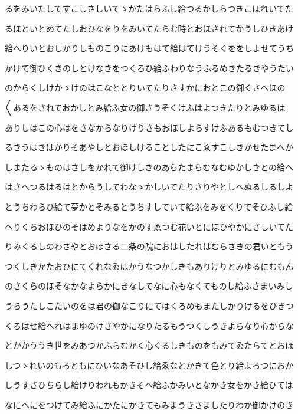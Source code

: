 \documentclass[a4paper,11pt,landscape]{ltjtarticle}
\begin{document}
\par\medskip
るをみいたしてすこしさしいてゝかたはらふし給つるかしらつきこほれいてた
\par\medskip
るほといとめてたしおひなをりをみいてたらむ時とおほされてかうしひきあけ
\par\medskip
給へりいとおしかりしものこりにあけもはて給はてけうそくををしよせてうち
\par\medskip
かけて御ひくきのしとけなきをつくろひ給ふわりなうふるめきたるきやうたい
\par\medskip
のからくしけかゝけのはこなととりいてたりさすかにおとこの御くさへほの
\par\medskip
〱あるをされておかしとみ給ふ女の御さうそくけふはよつきたりとみゆるは
\par\medskip
ありしはこの心はをさなからなりけりさもおほしよらすけふあるもむつきてし
\par\medskip
るきうはきはかりそあやしとおほしけることしたにこゑすこしきかせたまへか
\par\medskip
しまたるゝものはさしをかれて御けしきのあらたまらむなむゆかしきとの給へ
\par\medskip
はさへつるはるはとからうしてわなゝかしいてたりさりやとしへぬるしるしよ
\par\medskip
とうちわらひ給て夢かとそみるとうちすしていて給ふをみをくりてそひふし給
\par\medskip
へりくちおほひのそはめよりなをかのすゑつむ花いとにほひやかにさしいてた
\par\medskip
りみくるしのわさやとおほさる二条の院におはしたれはむらさきの君いともう
\par\medskip
つくしきかたおひにてくれなゐはかうなつかしきもありけりとみゆるにむもん
\par\medskip
のさくらのほそなかなよらかにきなしてなに心もなくてものし給ふさまいみし
\par\medskip
うらうたしこたいのをは君の御なこりにてはくろめもまたしかりけるをひきつ
\par\medskip
くろはせ給へれはまゆのけさやかになりたるもうつくしうきよらなり心からな
\par\medskip
とかかううき世をみあつかふらむかく心くるしきものをもみてゐたらてとおほ
\par\medskip
しつゝれいのもろともにひいなあそひし給ゑなとかきて色とり給よろつにおか
\par\medskip
しうすさひちらし給けりわれもかきそへ給ふかみいとなかき女をかき給ひては
\par\medskip
なにへにをつけてみ給ふにかたにかきてもみまうきさましたりわか御かけのき
\end{document}
